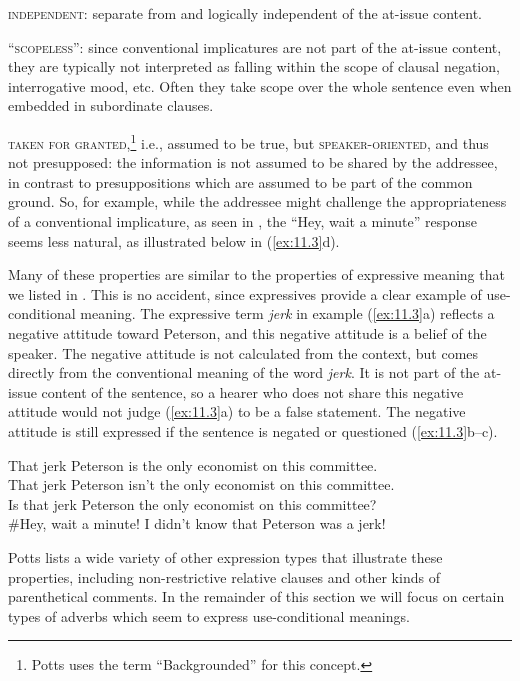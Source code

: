 \textsc{independent}: separate from and logically independent of the at-issue content.



\textsc{“scopeless”:} since conventional implicatures are not part of the at-issue content, they are typically not interpreted as falling within the scope of clausal negation, interrogative mood, etc. Often they take scope over the whole sentence even when embedded in subordinate clauses.



\textsc{taken for granted},\footnote{Potts uses the term “Backgrounded” for this concept.} i.e., assumed to be true, but \textsc{speaker-oriented}, and thus not presupposed: the information is not assumed to be shared by the addressee, in contrast to presuppositions which are assumed to be part of the common ground. So, for example, while the addressee might challenge the appropriateness of a conventional implicature, as seen in , the “Hey, wait a minute” response seems less natural, as illustrated below in (\ref{ex:11.3}d).



Many of these properties are similar to the properties of expressive meaning that we listed in . This is no accident, since expressives provide a clear example of use-conditional meaning. The expressive term \textit{jerk} in example (\ref{ex:11.3}a) reflects a negative attitude toward Peterson, and this negative attitude is a belief of the speaker. The negative attitude is not calculated from the context, but comes directly from the conventional meaning of the word \textit{jerk}. It is not part of the at-issue content of the sentence, so a hearer who does not share this negative attitude would not judge (\ref{ex:11.3}a) to be a false statement. The negative attitude is still expressed if the sentence is negated or questioned (\ref{ex:11.3}b--c).


\ea \label{ex:11.3}
\ea That jerk Peterson is the only economist on this committee.\\
\ex That jerk Peterson isn’t the only economist on this committee.\\
\ex Is that jerk Peterson the only economist on this committee?\\
\ex \#Hey, wait a minute! I didn’t know that Peterson was a jerk!
                       \z
\z


Potts lists a wide variety of other expression types that illustrate these properties, including non-restrictive relative clauses and other kinds of parenthetical comments. In the remainder of this section we will focus on certain types of adverbs which seem to express use-conditional meanings.


